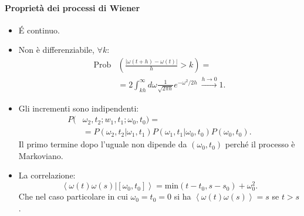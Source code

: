 \paragraph{Proprietà dei processi di Wiener}%
\label{par:Proprietà dei processi di Wiener}
\begin{itemize}
    \item \'E continuo.
    \item Non è differenziabile, $\forall k$:
	\[\begin{aligned}
	    \text{Prob}&\left(\frac{\left|\omega (t+h) - \omega (t) \right|}{h}> k\right) = \\
		       & = 2 \int_{kh}^{\infty} d\omega  \frac{1}{\sqrt{2\pi  h}} e^{- \omega^2 /2h} 
		       \ \xrightarrow[]{h\to 0} 1
	.\end{aligned}\]
    \item Gli incrementi sono indipendenti:
	\[\begin{aligned}
	    P(&\omega_2, t_2; w_1,t_1; \omega_0,t_0) = \\
	      &= P(\omega_2, t_2|\omega_1,t_1) P(\omega_1, t_1|\omega_0,t_0) P(\omega_0,t_0) 
	.\end{aligned}\]
	Il primo termine dopo l'uguale non dipende da $(\omega_0,t_0)$ perché il processo è Markoviano.
    \item La correlazione: 
    \[
	\left<\omega (t) \omega (s) | \left[\omega_0, t_0\right]\right> = \text{min}(t-t_0, s-s_0) + \omega_0^2
    .\] 
    Che nel caso particolare in cui $\omega_0=t_0=0$ si ha $\left<\omega (t) \omega (s) \right> = s$ se $t>s$.
    \usetikzlibrary{math}
    \begin{center}
    \end{center}
    \noindent
\end{itemize}
\clearpage
